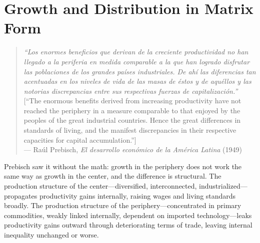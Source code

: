 \documentclass[../structural_economics_book.tex]{subfiles}
\begin{document}
\ifSubfilesClassLoaded{\setcounter{chapter}{2}}{}
\chapter{Growth and Distribution in Matrix Form}\label{ch:03}
\begin{quote}
\textit{``Los enormes beneficios que derivan de la creciente productividad no han llegado a la periferia en medida comparable a la que han logrado disfrutar las poblaciones de los grandes pa\'{i}ses industriales. De ah\'{i} las diferencias tan acentuadas en los niveles de vida de las masas de \'{e}stos y de aqu\'{e}llos y las notorias discrepancias entre sus respectivas fuerzas de capitalizaci\'{o}n.''}\\[0.3em]
\textnormal{[``The enormous benefits derived from increasing productivity have not reached the periphery in a measure comparable to that enjoyed by the peoples of the great industrial countries. Hence the great differences in standards of living, and the manifest discrepancies in their respective capacities for capital accumulation.'']}\\
\hfill --- Ra\'{u}l Prebisch, \textit{El desarrollo econ\'{o}mico de la Am\'{e}rica Latina} (1949)
\end{quote}
\nocite{prebisch1949desarrollo}

\vspace{1em}

Prebisch saw it without the math: growth in the periphery does not work the same way as growth in the center, and the difference is structural. The production structure of the center---diversified, interconnected, industrialized---propagates productivity gains internally, raising wages and living standards broadly. The production structure of the periphery---concentrated in primary commodities, weakly linked internally, dependent on imported technology---leaks productivity gains outward through deteriorating terms of trade, leaving internal inequality unchanged or worse.
\end{document}
